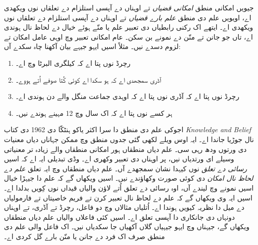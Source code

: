 \documentclass[../../../include/open-logic-section]{subfiles}
\begin{document}


جیویں امکانی منطق \emph{امکانی قضیاں} تے اوہناں دے آپسی استلزام
دے تعلقاں نوں ویکھدی اے، اویویں علم دی منطق \emph{علم بارے قضیاں}
تے اوہناں دے آپسی استلزام دے تعلقاں نوں ویکھدی اے۔ ایتھے اک رکنی
رابطیاں دی تعبیر علم یا منّے ہوئے خیال دے لحاظ نال ہوندی اے، تاں جو
جانن تے منّن دے نمونے بن سکن۔ عام امکانی تعبیر وچ اوہی عامل امکان
تے لزوم دسدے نیں۔ مثلاً اسیں ایہو جیہے بیان آکھنا چاہ سکدے آں:

\begin{enumerate}
\item رچرڈ نوں پتا اے کہ کیلگری البرٹا وچ اے۔
\item آڈری سمجھدی اے کہ ہو سکدا اے کوئی کُتا صوفے اُتے ہووے۔
\item رچرڈ نوں پتا اے کہ آڈری نوں پتا اے کہ اوہدی جماعت منگل والے دن ہوندی اے۔
\item ہر کسے نوں پتا اے کہ اک سال وچ 12 مہینے ہوندے نیں۔
\end{enumerate}
اجوکی علم دی منطق دا سرا اکثر یاکو ہنٹکّا دی 1962 دی کتاب
\emph{Knowledge and Belief} نال جوڑیا جاندا اے۔ ایہ اوس ویلے لکھی گئی
جدوں منطق وچ ممکن جہاناں دیاں معنیات دی ورتوں ودھ رہی سی۔ علم دیاں
منطقاں ہور امکانی منطقاں والے زیادہ تر معنیاتی وسیلے ای ورتدیاں نیں،
پر اوہناں دی تعبیر وکھری اے۔ وڈی تبدیلی ایہ اے کہ اسیں \emph{رسائی دے تعلق}
نوں کیہدا نشان سمجھدے آں۔ علم دیاں منطقاں وچ ایہ تعلق \emph{علم دے لحاظ
نال امکان} دی کوئی صورت وکھاؤندے نیں۔ اسیں ویکھاں گے کہ علم دا جیہڑا
خیال اسیں نمونے وچ لیندے آں، اوہ رسائی دے تعلق اُتے لاؤن والیاں قیداں
نوں کِویں بدلدا اے۔ اسیں ایہ وی ویکھاں گے کہ علم دے لحاظ نال تعبیر
کرن تے فریم خاصیتاں تے فارمولیاں دے میل دا نظریہ کیویں ہوندا اے۔
اُتلیاں مثالاں وچ دو فاعل، رچرڈ تے آڈری، تے اوہناں دونہاں دی جانکاری
دا آپسی تعلق اے۔ اسیں کئی فاعلاں والیاں علم دیاں منطقاں ویکھاں گے،
جیہناں وچ ایہو جیہیاں گلاں آکھیاں جا سکدیاں نیں۔ اک فاعل والی علم دی
منطق صرف اک فرد دے جانن یا منّن بارے گل کردی اے۔
\end{document}
